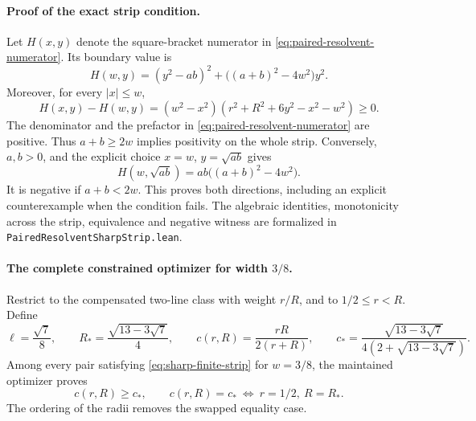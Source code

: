 \paragraph{Proof of the exact strip condition.}
Let \(H(x,y)\) denote the square-bracket numerator in
\eqref{eq:paired-resolvent-numerator}. Its boundary value is
\[
 H(w,y)=(y^2-ab)^2+\bigl((a+b)^2-4w^2\bigr)y^2.
\]
Moreover, for every \(|x|\le w\),
\[
 H(x,y)-H(w,y)
 =(w^2-x^2)(r^2+R^2+6y^2-x^2-w^2)\ge0.
\]
The denominator and the prefactor in
\eqref{eq:paired-resolvent-numerator} are positive. Thus \(a+b\ge2w\)
implies positivity on the whole strip. Conversely, \(a,b>0\), and the
explicit choice \(x=w\), \(y=\sqrt{ab}\) gives
\[
 H(w,\sqrt{ab})=ab\bigl((a+b)^2-4w^2\bigr).
\]
It is negative if \(a+b<2w\). This proves both directions, including
an explicit counterexample when the condition fails. The algebraic
identities, monotonicity across the strip, equivalence and negative
witness are formalized in \texttt{PairedResolventSharpStrip.lean}.

\paragraph{The complete constrained optimizer for width \(3/8\).}
Restrict to the compensated two-line class with weight \(r/R\), and to
\(1/2\le r<R\). Define
\[
 \ell=\frac{\sqrt7}{8},\qquad
 R_* = \frac{\sqrt{13-3\sqrt7}}4,\qquad
 c(r,R)=\frac{rR}{2(r+R)},\qquad
 c_* = \frac{\sqrt{13-3\sqrt7}}
              {4(2+\sqrt{13-3\sqrt7})}.
\]
Among every pair satisfying \eqref{eq:sharp-finite-strip} for
\(w=3/8\), the maintained optimizer proves
\begin{equation}\label{eq:sharp-finite-coefficient}
 c(r,R)\ge c_*,\qquad
 c(r,R)=c_*\ \Longleftrightarrow\ r=1/2,\ R=R_*.
\end{equation}
The ordering of the radii removes the swapped equality case.


